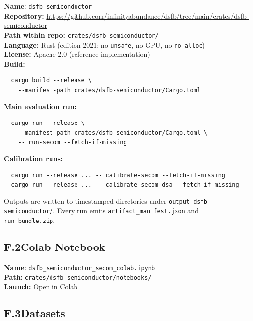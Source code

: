 \documentclass[11pt,letterpaper]{article}
\theoremstyle{scresult}
\begin{document}
\noindent\textbf{Name:} \texttt{dsfb-semiconductor}\\
\textbf{Repository:}
\url{https://github.com/infinityabundance/dsfb/tree/main/crates/dsfb-semiconductor}\\
\textbf{Path within repo:} \texttt{crates/dsfb-semiconductor/}\\
\textbf{Language:} Rust (edition 2021; no \texttt{unsafe}, no GPU, no
\texttt{no\_alloc})\\
\textbf{License:} Apache 2.0 (reference implementation)\\
\textbf{Build:}
\begin{verbatim}
  cargo build --release \
    --manifest-path crates/dsfb-semiconductor/Cargo.toml
\end{verbatim}
\textbf{Main evaluation run:}
\begin{verbatim}
  cargo run --release \
    --manifest-path crates/dsfb-semiconductor/Cargo.toml \
    -- run-secom --fetch-if-missing
\end{verbatim}
\textbf{Calibration runs:}
\begin{verbatim}
  cargo run --release ... -- calibrate-secom --fetch-if-missing
  cargo run --release ... -- calibrate-secom-dsa --fetch-if-missing
\end{verbatim}
Outputs are written to timestamped directories under
\texttt{output-dsfb-semiconductor/}.  Every run emits
\texttt{artifact\_manifest.json} and \texttt{run\_bundle.zip}.

\subsection*{F.2\quad Colab Notebook}

\noindent\textbf{Name:} \texttt{dsfb\_semiconductor\_secom\_colab.ipynb}\\
\textbf{Path:} \texttt{crates/dsfb-semiconductor/notebooks/}\\
\textbf{Launch:}
\href{https://colab.research.google.com/github/infinityabundance/dsfb/blob/main/crates/dsfb-semiconductor/notebooks/dsfb_semiconductor_secom_colab.ipynb}{Open in Colab}

\subsection*{F.3\quad Datasets}
\end{document}
